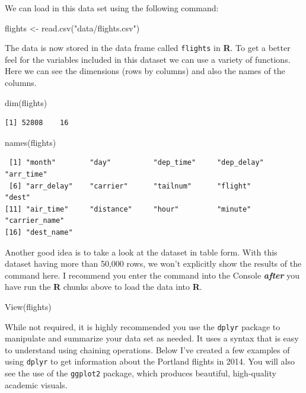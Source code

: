 \documentclass [11pt, proquest] {uwthesis}[2015/03/03]
\newenvironment{Shaded}{\begin{snugshade}}{\end{snugshade}}
\newcommand{\FunctionTok}[1]{\textcolor[rgb]{0.00,0.00,0.00}{#1}}
\newcommand{\NormalTok}[1]{#1}
\newcommand{\OtherTok}[1]{\textcolor[rgb]{0.56,0.35,0.01}{#1}}
\newcommand{\StringTok}[1]{\textcolor[rgb]{0.31,0.60,0.02}{#1}}
\begin{document}
We can load in this data set using the following command:
\begin{Shaded}
\begin{Highlighting}[]
\NormalTok{flights }\OtherTok{\textless{}{-}} \FunctionTok{read.csv}\NormalTok{(}\StringTok{"data/flights.csv"}\NormalTok{)}
\end{Highlighting}
\end{Shaded}
The data is now stored in the data frame called \texttt{flights} in \textbf{R}. To get a better feel for the variables included in this dataset we can use a variety of functions. Here we can see the dimensions (rows by columns) and also the names of the columns.
\begin{Shaded}
\begin{Highlighting}[]
\FunctionTok{dim}\NormalTok{(flights)}
\end{Highlighting}
\end{Shaded}
\begin{verbatim}
[1] 52808    16
\end{verbatim}
\begin{Shaded}
\begin{Highlighting}[]
\FunctionTok{names}\NormalTok{(flights)}
\end{Highlighting}
\end{Shaded}
\begin{verbatim}
 [1] "month"        "day"          "dep_time"     "dep_delay"    "arr_time"    
 [6] "arr_delay"    "carrier"      "tailnum"      "flight"       "dest"        
[11] "air_time"     "distance"     "hour"         "minute"       "carrier_name"
[16] "dest_name"   
\end{verbatim}
Another good idea is to take a look at the dataset in table form. With this dataset having more than 50,000 rows, we won't explicitly show the results of the command here. I recommend you enter the command into the Console \textbf{\emph{after}} you have run the \textbf{R} chunks above to load the data into \textbf{R}.
\begin{Shaded}
\begin{Highlighting}[]
\FunctionTok{View}\NormalTok{(flights)}
\end{Highlighting}
\end{Shaded}
While not required, it is highly recommended you use the \texttt{dplyr} package to manipulate and summarize your data set as needed. It uses a syntax that is easy to understand using chaining operations. Below I've created a few examples of using \texttt{dplyr} to get information about the Portland flights in 2014. You will also see the use of the \texttt{ggplot2} package, which produces beautiful, high-quality academic visuals.
\end{document}
